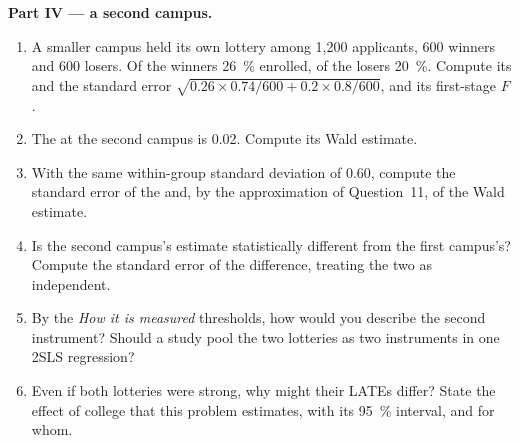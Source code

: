 \begin{problem}
\medskip\noindent\textbf{Part IV --- a second campus.}
\begin{enumerate}[resume]
\item A smaller campus held its own lottery among 1{,}200 applicants, 600
winners and 600 losers. Of the winners 26~\% enrolled, of the losers 20~\%.
Compute its  and the standard error
$\sqrt{0.26 \times 0.74/600 + 0.2 \times 0.8/600}$, and its first-stage $F$.
\item The  at the second campus is 0.02. Compute its Wald estimate.
\item With the same within-group standard deviation of 0.60, compute the
standard error of the  and, by the approximation of Question~11,
of the Wald estimate.
\item Is the second campus's estimate statistically different from the first
campus's? Compute the standard error of the difference, treating the two as
independent.
\item By the \emph{How it is measured} thresholds, how would you describe the
second instrument? Should a study pool the two lotteries as two instruments in
one 2SLS regression?
\item Even if both lotteries were strong, why might their LATEs differ? State
the effect of college that this problem estimates, with its 95~\% interval,
and for whom.
\end{enumerate}
\end{problem}

